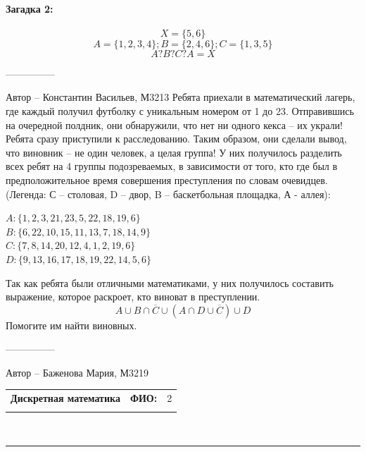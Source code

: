 \documentclass[10pt]{exam}
\newcommand{\class}{Дискретная математика}
\newcommand{\examdate}{}
\begin{document}
\begin{questions}
\paragraph{Загадка 2:}
\begin{equation*}
    X=\{5,6\}
\end{equation*}
\begin{equation*}
    A=\{1,2,3,4\}; B=\{2,4,6\}; C=\{1,3,5\}
    \end{equation*}
\begin{equation*}
    A ? B ? C ? A = X
\end{equation*}

---------------

Автор -- Константин Васильев, М3213\question
Ребята приехали в математический лагерь, где каждый получил футболку с уникальным номером от 1 до 23. Отправившись на очередной полдник, они обнаружили, что нет ни одного кекса – их украли! Ребята сразу приступили к расследованию. Таким образом, они сделали вывод, что виновник – не один человек, а целая группа! У них получилось разделить всех ребят на 4 группы подозреваемых, в зависимости от того, кто где был в предположительное время совершения преступления по словам очевидцев.
\\(Легенда: С – столовая, D – двор, B – баскетбольная площадка, А - аллея): 
\begin{center}
$A: \{1, 2, 3, 21, 23, 5, 22, 18, 19, 6\}$
\\
$B: \{6, 22, 10, 15, 11, 13, 7, 18, 14, 9\}$
\\
$C: \{7, 8, 14, 20, 12, 4, 1, 2, 19, 6\}$
\\
$D: \{9, 13, 16, 17, 18, 19, 22, 14, 5, 6\}$
\end{center}
Так как ребята были отличными математиками, у них получилось составить выражение, которое раскроет, кто виноват в преступлении. 
\begin{equation*}
    A \cup B \cap \overline{C} \cup (A \cap D \cup \overline{C}) \cup D
\end{equation*}
Помогите им найти виновных.

---------------

Автор -- Баженова Мария, М3219

\end{questions}
\newpage
\begin{flushright}
\begin{tabular}{p{2.8in} r l}
\textbf{\class} & \textbf{ФИО:} &2\\

\textbf{\examdate} &&\\
\end{tabular}\\
\end{flushright}
\rule[1ex]{\textwidth}{.1pt}
\end{document}
